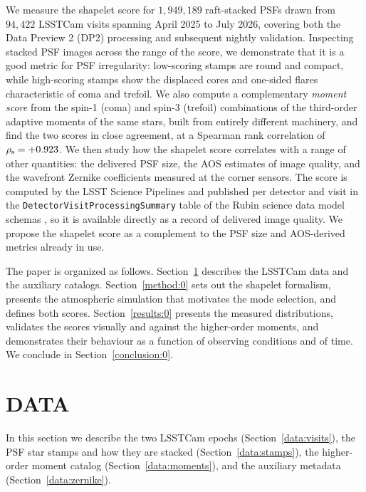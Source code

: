 \documentclass[]{spie}
\begin{document}
We measure the shapelet score for $1{,}949{,}189$ raft-stacked PSFs drawn from $94{,}422$
LSSTCam visits spanning April 2025 to July 2026, covering both the Data Preview 2 (DP2)
processing \cite{DP2} and subsequent nightly validation. Inspecting stacked PSF images
across the range of the score, we demonstrate that it is a good metric for PSF
irregularity: low-scoring stamps are round and compact, while high-scoring stamps show the
displaced cores and one-sided flares characteristic of coma and trefoil. We also compute a
complementary \emph{moment score} from the spin-1 (coma) and spin-3 (trefoil) combinations
of the third-order adaptive moments of the same stars, built from entirely different
machinery, and find the two scores in close agreement, at a Spearman rank correlation of
$\rho_{\rm s} = +0.923$. We then study how the shapelet score correlates with a range of
other quantities: the delivered PSF size, the AOS estimates of image quality, and the
wavefront Zernike coefficients measured at the corner sensors. The score
is computed by the LSST Science Pipelines and published per detector and visit in the
\texttt{DetectorVisitProcessingSummary} table of the Rubin science data model schemas
\cite{SDMSchemas}, so it is available directly as a record of delivered image quality. We
propose the shapelet score as a complement to the PSF size and AOS-derived metrics already
in use.

The paper is organized as follows. Section~\ref{data:0} describes the LSSTCam data and the
auxiliary catalogs. Section~\ref{method:0} sets out the shapelet formalism, presents the
atmospheric simulation that motivates the mode selection, and defines both scores.
Section~\ref{results:0} presents the measured distributions, validates the scores visually
and against the higher-order moments, and demonstrates their behaviour as a function of
observing conditions and of time. We conclude in Section~\ref{conclusion:0}.


\section{DATA}
\label{data:0}

In this section we describe the two LSSTCam epochs (Section~\ref{data:visits}), the PSF star
stamps and how they are stacked (Section~\ref{data:stamps}), the higher-order moment catalog
(Section~\ref{data:moments}), and the auxiliary metadata (Section~\ref{data:zernike}).
\end{document}
